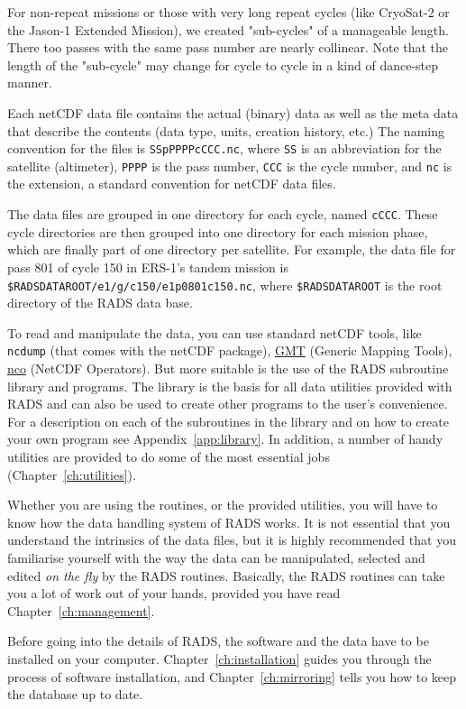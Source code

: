 \documentclass[a4paper,11pt,openany,natbib,nomargin]{thesis}
\makeatletter
\newcommand\prog[1]{\url{#1}\index{programs!#1@\protect\url{#1}}}
\makeatother
\begin{document}
For non-repeat missions or those with very long repeat cycles (like CryoSat-2 or the Jason-1 Extended Mission), we created "sub-cycles" of a manageable length. There too passes with the same pass number are nearly collinear. Note that the length of the "sub-cycle" may change for cycle to cycle in a kind of dance-step manner.

Each netCDF data file contains the actual (binary) data as well as the meta data that describe the contents
(data type, units, creation history, etc.) The naming convention for the files is \verb|SSpPPPPcCCC.nc|, where \verb|SS| is an abbreviation for the satellite (altimeter), \verb|PPPP| is the pass number, \verb|CCC| is the cycle number, and \verb|nc| is the extension, a standard convention for netCDF data files.

The data files are grouped in one directory for each cycle, named \verb|cCCC|. These cycle directories are then grouped into one directory for each mission phase, which are finally part of one directory per satellite. For example, the data file for pass 801 of cycle 150 in ERS-1's tandem mission is \verb|$RADSDATAROOT/e1/g/c150/e1p0801c150.nc|, where \verb|$RADSDATAROOT| is the root directory of the RADS data base.

To read and manipulate the data, you can use standard netCDF tools, like \verb|ncdump| (that comes with the netCDF package), \prog{GMT} (Generic Mapping Tools), \prog{nco} (NetCDF Operators). But more suitable is the use of the RADS subroutine library and programs. The library is the basis for all data utilities provided with RADS and can also be used to create other programs to the user's convenience. For a description on each of the subroutines in the library and on how to create your own program see Appendix~\ref{app:library}. In addition, a number of handy utilities are provided to do some of the most essential jobs (Chapter~\ref{ch:utilities}).

Whether you are using the routines, or the provided utilities, you will have to know how the data handling system of RADS works. It is not essential that you understand the intrinsics of the data files, but it is highly recommended that you familiarise yourself with the way the data can be manipulated, selected and edited \emph{on the fly} by the RADS routines. Basically, the RADS routines can take you a lot of work out of your hands, provided you have read Chapter~\ref{ch:management}.

Before going into the details of RADS, the software and the data have to be installed on your computer. Chapter~\ref{ch:installation} guides you through the process of software installation, and Chapter~\ref{ch:mirroring} tells you how to keep the database up to date.
\end{document}
